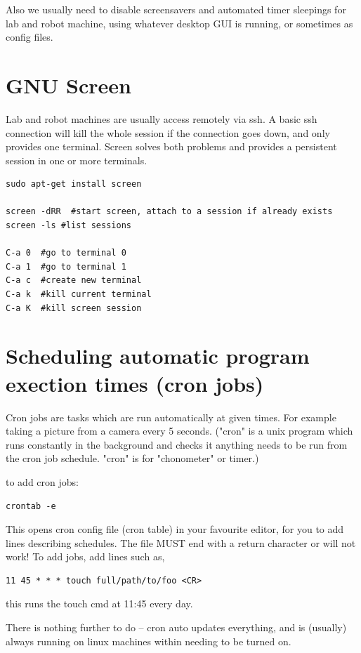 \documentclass[oneside,english]{scrbook}
\begin{document}
Also we usually need to disable screensavers and automated timer sleepings for lab and robot machine, using whatever desktop GUI is running, or sometimes as config files.

\section{GNU Screen}
Lab and robot machines are usually access remotely via ssh.  A basic ssh connection will kill the whole session if the connection goes down, and only provides one terminal.   Screen solves both problems and provides a persistent session in one or more terminals.

\begin{lstlisting}
sudo apt-get install screen

screen -dRR  #start screen, attach to a session if already exists
screen -ls #list sessions

C-a 0  #go to terminal 0
C-a 1  #go to terminal 1
C-a c  #create new terminal
C-a k  #kill current terminal
C-a K  #kill screen session

\end{lstlisting}

\section{Scheduling automatic program exection times (cron jobs)}

Cron jobs are tasks which are run automatically at given times.  For example taking a picture from a camera every 5 seconds.  ("cron" is a unix program which runs constantly in the background and checks it anything needs to be run from the cron job schedule. "cron" is for "chonometer" or timer.)

to add cron jobs:
\begin{lstlisting}
crontab -e     
\end{lstlisting}
This opens cron config file (cron table) in your favourite editor, for you to add lines describing schedules.  The file MUST end with a return character or will not work!  To add jobs, add lines such as,

\begin{lstlisting}
11 45 * * * touch full/path/to/foo <CR>
\end{lstlisting}
this runs the touch cmd at 11:45 every day.

There is nothing further to do -- cron auto updates everything, and is (usually) always running on linux machines within needing to be turned on.
\end{document}
